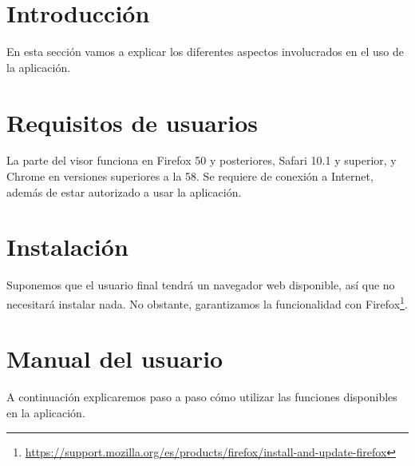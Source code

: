 
\section{Introducción}
En esta sección vamos a explicar los diferentes aspectos involucrados en el uso de la aplicación.

\section{Requisitos de usuarios}
La parte del visor funciona en Firefox 50 y posteriores, Safari 10.1 y superior, y Chrome en versiones superiores a la 58.
Se requiere de conexión a Internet, además de estar autorizado a usar la aplicación.

\section{Instalación}
Suponemos que el usuario final tendrá un navegador web disponible, así que no necesitará instalar nada. No obstante, garantizamos la funcionalidad con Firefox\footnote{\url{https://support.mozilla.org/es/products/firefox/install-and-update-firefox}}.

\section{Manual del usuario}
A continuación explicaremos paso a paso cómo utilizar las funciones disponibles en la aplicación.

